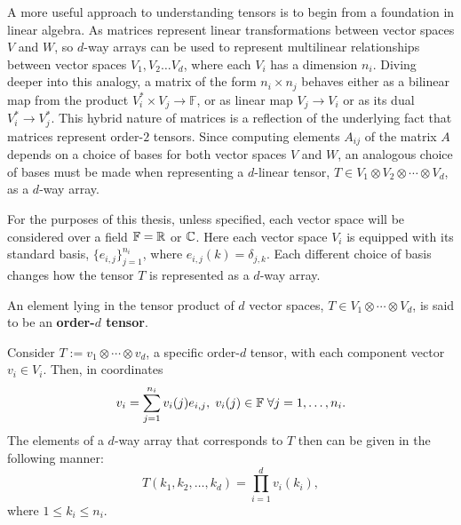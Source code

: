 \documentclass[../Lael_John_MasterThesis_Draft.tex]{subfiles}
\begin{document}
A more useful approach to understanding tensors is to begin from a foundation in linear algebra. As matrices represent linear transformations between vector spaces $V$ and $W$, so $d$-way arrays can be used to represent multilinear relationships between vector spaces $V_1, V_2 \ldots V_d$, where each $V_i$ has a dimension $n_i$. Diving deeper into this analogy, a matrix of the form $n_i \times n_j$ behaves either as a  bilinear map from the product $V_i^* \times V_j \to \mathbb{F}$, or as linear map $V_j \to V_i$ or as its dual $V_i^* \to V_j^*$. This hybrid nature of matrices is a reflection of the underlying fact that matrices represent order-$2$ tensors. Since computing elements $A_{ij}$ of the matrix $A$ depends on a choice of bases for both vector spaces $V$ and $W$, an analogous choice of bases must be made when representing a $d$-linear tensor, $T \in V_1 \otimes V_2 \otimes \cdots \otimes V_d$, as a $d$-way array.

%
%
For the purposes of this thesis, unless specified, each vector space will be considered over a field $\mathbb{F} = \mathbb{R}$ or $\mathbb{C}$. Here each vector space $V_i$ is equipped with its standard basis, $\{e_{i,j}\}_{j=1}^{n_i}$, where $e_{i,j}(k) = \delta_{j,k}$. Each different choice of basis changes how the tensor $T$ is represented as a $d$-way array.

\begin{definition}\label{defn:tensororder}
    An element lying in the tensor product of $d$ vector spaces, $T \in V_1 \otimes \cdots\otimes V_d$, is said to be an \textbf{order-$d$ tensor}.
\end{definition}
Consider $T := v_1 \otimes \cdots \otimes v_d$, a specific order-$d$ tensor, with each component vector $v_i \in V_i$. Then, in coordinates $$v_i = \sum_{j=1}^{n_i} v_i(j)e_{i,j}, \; v_i(j) \in \mathbb{F} \;\forall j = 1, \ldots, n_i.$$
  The elements of a $d$-way array that corresponds to $T$ then can be given in the following manner: $$T(k_1, k_2, \ldots, k_d) = \prod_{i=1}^{d} v_i(k_i),$$where $1 \leq k_i \leq n_i$. 
\end{document}
